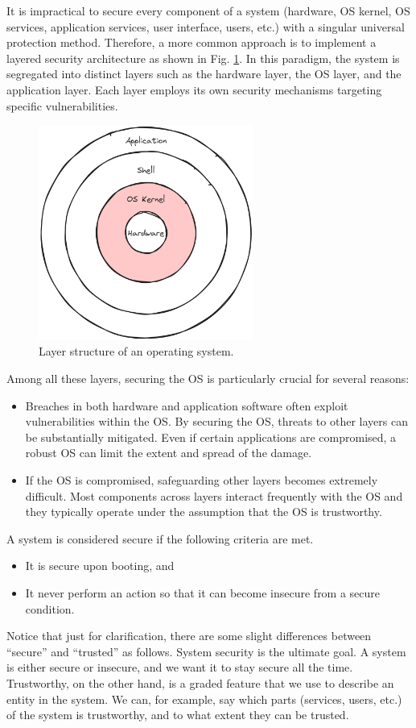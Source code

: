 It is impractical to secure every component of a system (hardware, OS kernel, OS services, application services, user interface, users, etc.) with a singular universal protection method. Therefore, a more common approach is to implement a layered security architecture as shown in Fig. \ref{ch:ossec:fig:layerstructure}. In this paradigm, the system is segregated into distinct layers such as the hardware layer, the OS layer, and the application layer. Each layer employs its own security mechanisms targeting specific vulnerabilities.
\begin{figure}[htbp]
	\centering
	\includegraphics[width=200pt]{chapters/ch-computer-security-basics/figures/os_layer.png}
	\caption{Layer structure of an operating system.} \label{ch:ossec:fig:layerstructure}
\end{figure}

Among all these layers, securing the OS is particularly crucial for several reasons:
\begin{itemize}
	\item Breaches in both hardware and application software often exploit vulnerabilities within the OS. By securing the OS, threats to other layers can be substantially mitigated. Even if certain applications are compromised, a robust OS can limit the extent and spread of the damage.
	\item If the OS is compromised, safeguarding other layers becomes extremely difficult. Most components across layers interact frequently with the OS and they typically operate under the assumption that the OS is trustworthy.
\end{itemize}

A system is considered secure if the following criteria are met.
\begin{itemize}
	\item It is secure upon booting, and
	\item It never perform an action so that it can become insecure from a secure condition.
\end{itemize}
Notice that just for clarification, there are some slight differences between ``secure'' and ``trusted'' as follows. System security is the ultimate goal. A system is either secure or insecure, and we want it to stay secure all the time. Trustworthy, on the other hand, is a graded feature that we use to describe an entity in the system. We can, for example, say which parts (services, users, etc.) of the system is trustworthy, and to what extent they can be trusted.

